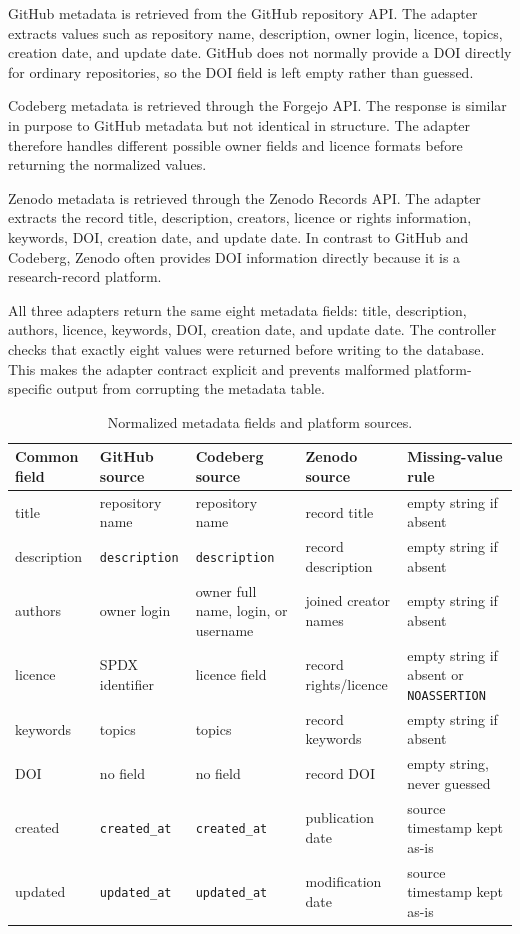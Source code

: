 GitHub metadata is retrieved from the GitHub repository API. The adapter extracts values such as repository name, description, owner login, licence, topics, creation date, and update date. GitHub does not normally provide a DOI directly for ordinary repositories, so the DOI field is left empty rather than guessed.

Codeberg metadata is retrieved through the Forgejo API. The response is similar in purpose to GitHub metadata but not identical in structure. The adapter therefore handles different possible owner fields and licence formats before returning the normalized values.

Zenodo metadata is retrieved through the Zenodo Records API. The adapter extracts the record title, description, creators, licence or rights information, keywords, DOI, creation date, and update date. In contrast to GitHub and Codeberg, Zenodo often provides DOI information directly because it is a research-record platform.

All three adapters return the same eight metadata fields: title, description, authors, licence, keywords, DOI, creation date, and update date. The controller checks that exactly eight values were returned before writing to the database. This makes the adapter contract explicit and prevents malformed platform-specific output from corrupting the metadata table.

\begin{table}[ht]
\centering
\caption{Normalized metadata fields and platform sources.}
\label{tab:metadata-fields-sources}
\small
\begin{tabularx}{\textwidth}{@{}p{1.8cm}p{2.4cm}p{2.6cm}p{2.4cm}X@{}}
\toprule
Common field & GitHub source & Codeberg source & Zenodo source & Missing-value rule\tabularnewline
\midrule
title & repository name & repository name & record title & empty string if absent\tabularnewline
description & \texttt{description} & \texttt{description} & record description & empty string if absent\tabularnewline
authors & owner login & owner full name, login, or username & joined creator names & empty string if absent\tabularnewline
licence & SPDX identifier & licence field & record rights/licence & empty string if absent or \texttt{NOASSERTION}\tabularnewline
keywords & topics & topics & record keywords & empty string if absent\tabularnewline
DOI & no field & no field & record DOI & empty string, never guessed\tabularnewline
created & \texttt{created\_at} & \texttt{created\_at} & publication date & source timestamp kept as-is\tabularnewline
updated & \texttt{updated\_at} & \texttt{updated\_at} & modification date & source timestamp kept as-is\tabularnewline
\bottomrule
\end{tabularx}
\end{table}

